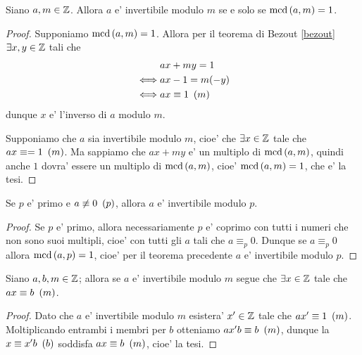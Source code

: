\begin{theorem}\label{invertibilita_mod_m}
    Siano $a, m \in \mathbb{Z}$. Allora $a$ e' invertibile modulo $m$ se e solo se $\operatorname{mcd}\left(a, m\right) = 1$. 
\end{theorem}
\begin{proof}
    Supponiamo $\operatorname{mcd}\left(a, m\right) = 1$. Allora per il teorema di Bezout \ref{bezout} $\exists x, y \in \mathbb{Z}$ tali che
    \begin{alignat*}{1}
        &ax + my = 1 \\
        \iff &ax - 1 = m(-y) \\
        \iff &ax \equiv 1 \ \left(m\right)
    \end{alignat*}
    dunque $x$ e' l'inverso di $a$ modulo $m$.

    Supponiamo che $a$ sia invertibile modulo $m$, cioe' che $\exists x \in \mathbb{Z}$ tale che $ax \equiv= 1 \ \left(m\right)$. Ma sappiamo che $ax + my$ e' un multiplo di $\operatorname{mcd}\left(a, m\right)$, quindi anche $1$ dovra' essere un multiplo di $\operatorname{mcd}\left(a, m\right)$, cioe' $\operatorname{mcd}\left(a, m\right) = 1$, che e' la tesi.
\end{proof}
\begin{corollary}
    Se $p$ e' primo e $a \not\equiv 0 \ \left(p\right)$, allora $a$ e' invertibile modulo $p$.
\end{corollary}
\begin{proof}
    Se $p$ e' primo, allora necessariamente $p$ e' coprimo con tutti i numeri che non sono suoi multipli, cioe' con tutti gli $a$ tali che $a \equiv_p 0$. Dunque se $a \equiv_p 0$ allora $\operatorname{mcd}\left(a, p\right) = 1$, cioe' per il teorema precedente $a$ e' invertibile modulo $p$.
\end{proof}

\begin{proposition} \label{se_invertibile_allora_soluzione}
    Siano $a, b, m \in \mathbb{Z}$; allora se $a$ e' invertibile modulo $m$ segue che $\exists x \in \mathbb{Z}$ tale che $ax \equiv b \ \left(m\right)$.
\end{proposition}
\begin{proof}
    Dato che $a$ e' invertibile modulo $m$ esistera' $x' \in \mathbb{Z}$ tale che $ax' \equiv 1 \ \left(m\right)$. Moltiplicando entrambi i membri per $b$ otteniamo $ax'b \equiv b \ \left(m\right)$, dunque la $x \equiv x'b \ \left(b\right)$ soddisfa $ax \equiv b \ \left(m\right)$, cioe' la tesi.
\end{proof}

